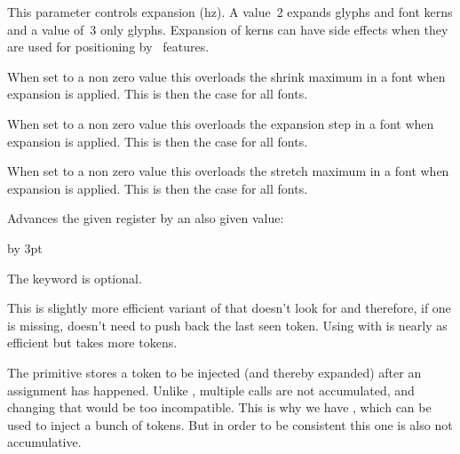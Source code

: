 \stopoldprimitive

\startnewprimitive[title={\prm {adjustspacing}}]

This parameter controls expansion (hz). A value~2 expands glyphs and font kerns
and a value of~3 only glyphs. Expansion of kerns can have side effects when they
are used for positioning by \OPENTYPE\ features.

\stopnewprimitive

\startnewprimitive[title={\prm {adjustspacingshrink}}]

When set to a non zero value this overloads the shrink maximum in a font when
expansion is applied. This is then the case for all fonts.

\stopnewprimitive

\startnewprimitive[title={\prm {adjustspacingstep}}]

When set to a non zero value this overloads the expansion step in a font when
expansion is applied. This is then the case for all fonts.

\stopnewprimitive

\startnewprimitive[title={\prm {adjustspacingstretch}}]

When set to a non zero value this overloads the stretch maximum in a font when
expansion is applied. This is then the case for all fonts.

\stopnewprimitive

\startoldprimitive[title={\prm {advance}}]

Advances the given register by an also given value:

\starttyping
\advance\scratchdimen      10pt
\advance\scratchdimen      by 3pt
\advance\scratchcounterone \zerocount
\advance\scratchcounterone \scratchcountertwo
\stoptyping

The  keyword is optional.

\stopoldprimitive

\startnewprimitive[title={\prm {advanceby}}]

This is slightly more efficient variant of  that doesn't look for
 and therefore, if one is missing, doesn't need to push back the last
seen token. Using  with  is nearly as efficient but takes
more tokens.

\stopnewprimitive

\startnewprimitive[title={\prm {afterassigned}}]

The  primitive stores a token to be injected (and thereby
expanded) after an assignment has happened. Unlike , multiple
calls are not accumulated, and changing that would be too incompatible. This is
why we have , which can be used to inject a bunch of
tokens. But in order to be consistent this one is also not accumulative.

